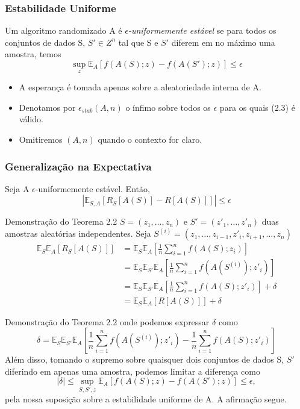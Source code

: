 \documentclass{beamer}
\newcommand{\EE}{\mathbb{E}}
\begin{document}
\begin{frame}
\frametitle{Estabilidade Uniforme}
\begin{definition}[2.1]
Um algoritmo randomizado A é \emph{$\epsilon$-uniformemente estável} se para todos os conjuntos de dados S, \(S' \in Z^n\) tal que S e \(S'\) diferem em no máximo uma amostra, temos
\begin{equation*}
    \tag{2.3}
    \sup_{z} \EE_{A}[f(A(S);z) - f(A(S');z)] \le \epsilon 
\end{equation*}
\end{definition}
\small
\begin{itemize}
    \item A esperança é tomada apenas sobre a aleatoriedade interna de A.
    \item Denotamos por $\epsilon_{stab}(A,n)$ o ínfimo sobre todos os $\epsilon$ para os quais (2.3) é válido.
    \item Omitiremos $(A,n)$ quando o contexto for claro.
\end{itemize}
\end{frame}

\begin{frame}
\frametitle{Generalização na Expectativa}
\begin{theorem}[2.2] Seja A \(\epsilon\)-uniformemente estável. Então,
$$ |\EE_{S,A}[R_{S}[A(S)] - R[A(S)]]| \le \epsilon $$ 
\end{theorem}
\end{frame}

\begin{frame}{Demonstração do Teorema 2.2} 
\(S=(z_{1},\ldots,z_{n})\) e \(S'=(z'_{1},\ldots,z'_{n})\) duas amostras aleatórias independentes. 
Seja \(S^{(i)}=(z_{1},\ldots,z_{i-1},z'_{i},z_{i+1},\ldots,z_{n})\)  
\begin{align*}
\EE_{S}\EE_{A}[R_{S}[A(S)]] &= \EE_{S}\EE_{A}[\frac{1}{n}\sum_{i=1}^{n}f(A(S);z_{i})] \\
&= \EE_{S}\EE_{S'}\EE_{A}[\frac{1}{n}\sum_{i=1}^{n}f(A(S^{(i)});z'_{i})] \\
&= \EE_{S}\EE_{S'}\EE_{A}[\frac{1}{n}\sum_{i=1}^{n}f(A(S);z'_{i})] + \delta \\
&= \EE_{S}\EE_{A}[R[A(S)]] + \delta
\end{align*}
\end{frame}

\begin{frame}{Demonstração do Teorema 2.2} 
    onde podemos expressar \(\delta\) como
$$ \delta = \EE_{S}\EE_{S'}\EE_{A}[\frac{1}{n}\sum_{i=1}^{n}f(A(S^{(i)});z'_{i}) - \frac{1}{n}\sum_{i=1}^{n}f(A(S);z'_{i})] $$
Além disso, tomando o supremo sobre quaisquer dois conjuntos de dados S, \(S'\) diferindo em apenas uma amostra, podemos limitar a diferença como
$$ |\delta| \le \sup_{S,S',z}\EE_{A}[f(A(S);z) - f(A(S');z)] \le \epsilon, $$
pela nossa suposição sobre a estabilidade uniforme de A. A afirmação segue.  
\end{frame}
\end{document}
